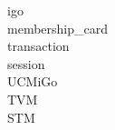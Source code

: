 \documentclass[a4paper,12pt]{report}
\begin{document}
	

\gls{igo}\\
\gls{membership_card}\\
\gls{transaction}\\
\gls{session}	\\
\gls{UCMiGo}	\\
\gls{TVM}	\\
\gls{STM}	\\
	
\printglossaries
	
\end{document}
